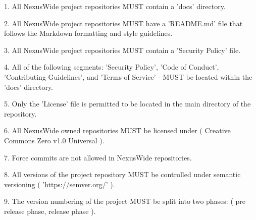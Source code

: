 \documentclass[13pt]{scrarticle}
\newcommand{\nexusrule}[1]{\Tribar[1][white][yellow][red]\color{blue} #1}
\begin{document}
    \nexusrule{    1. All NexusWide project repositories MUST contain a 'docs' directory.} \newline

    \nexusrule{    2. All NexusWide project repositories MUST have a 'README.md' file
    that follows the Markdown formatting and style guidelines.
    } \newline

    \nexusrule{    3. All NexusWide project repositories MUST contain a 'Security Policy' file.} \newline

    \nexusrule{    4. All of the following segments: 'Security Policy', 'Code of Conduct', 'Contributing Guidelines', and 'Terms of Service'
        - MUST be located within the 'docs' directory.
    } \newline

    \nexusrule{    5. Only the 'License' file is permitted to be located in the main directory of the repository.} \newline

    \nexusrule{6. All NexusWide owned repositories MUST be licensed under ( Creative Commons Zero v1.0 Universal ).} \newline

    \nexusrule{    7. Force commits are not allowed in NexusWide repositories.} \newline

    \nexusrule{    8. All versions of the project repository MUST be controlled under semantic versioning ( 'https://semver.org/' ).} \newline

    \nexusrule{    9. The version numbering of the project MUST be split into two phases: ( pre release phase, release phase ).} \newline
\end{document}
